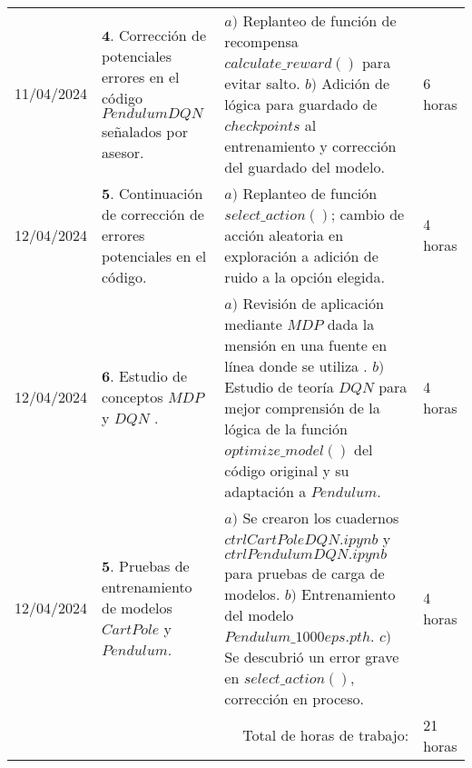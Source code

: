 \documentclass[12pt]{article}
\begin{document}
\hfill\\
\begin{minipage}[h]{\textwidth}
	\centering
	\begin{tabularx}{\textwidth}{|p{2cm}|X|X|p{2cm}|} 
		\hline		
		
	 	11/04/2024 & 
	 	$\mathbf{4}.$ Corrección de potenciales errores en el código $PendulumDQN$ señalados por asesor. &
	 	$a)$ Replanteo de función de recompensa $calculate\_ reward()$ para evitar salto. \newline
	 	$b)$ Adición de lógica para guardado de $checkpoints$ al entrenamiento y corrección del guardado del modelo. \newline & 
	 	6 horas \\
	 	12/04/2024 & 
	 	$\mathbf{5}.$ Continuación de corrección de errores potenciales en el código. &
	 	$a)$ Replanteo de función $select\_ action()$; cambio de acción aleatoria en exploración a adición de ruido a la opción elegida. \newline & 
	 	4 horas \\
	 	12/04/2024 & 
	 	$\mathbf{6}.$ Estudio de conceptos $MDP$ \cite{PAlvaradoMDP1} y $DQN$ \cite{PAlvaradoDQN1} . &
	 	$a)$ Revisión de aplicación mediante $MDP$ dada la mensión en una fuente en línea donde se utiliza \cite{CartPoleRLcrtl1}. \newline
	 	$b)$ Estudio de teoría $DQN$ para mejor comprensión de la lógica de la función $optimize\_ model()$ del código original \cite{DQNCart} y su adaptación a $Pendulum$. \newline & 
	 	4 horas \\
	 	12/04/2024 & 
	 	$\mathbf{5}.$ Pruebas de entrenamiento de modelos $CartPole$ y $Pendulum$. &
	 	$a)$ Se crearon los cuadernos $ctrlCartPoleDQN.ipynb$ y $ctrlPendulumDQN.ipynb$ para pruebas de carga de modelos. \newline
	 	$b)$ Entrenamiento del modelo $Pendulum\_1000eps.pth$. \newline
	 	$c)$ Se descubrió un error grave en $select\_action()$, corrección en proceso. \newline & 
	 	4 horas \\
	 	
	 	\hline
		\multicolumn{3}{|r|}{Total de horas de trabajo:} & 21 horas \\ 
	 	\hline                 
	\end{tabularx}
\end{minipage}
\end{document}
